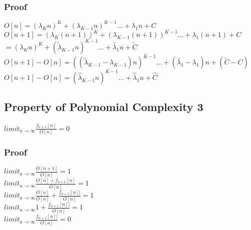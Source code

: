 \documentclass[11pt]{article}
\begin{document}
\subsubsection{Proof}
\vspace{1mm}
\begin{center}
$
O[n] = (\lambda_K n)^K + (\lambda_{K-1} n)^{K-1}... + \lambda_1 n + C
$
\\ \vspace{2mm}
$
O[n+1] = (\lambda_K (n+1))^K + (\lambda_{K-1} (n+1))^{K-1}... + \lambda_1 (n+1) + C
$
\\ \vspace{2mm}
$ 
=  (\lambda_K n)^K + (\tilde{\lambda}_{K-1} n)^{K-1}... + \tilde{\lambda_1} n + \tilde{C}
$
\\ \vspace{2mm}
$
O[n+1] - O[n] = ((\tilde{\lambda}_{K-1}- \lambda_{K-1})n)^{K-1}... + (\tilde{\lambda_1} - \lambda_1) n + (\tilde{C} - C)
$
\\ \vspace{2mm}
$
O[n+1] - O[n] = (\hat{\lambda}_{K-1}n)^{K-1}... + \hat{\lambda}_1  n + \hat{C}
$
\end{center}




\subsection{Property of Polynomial Complexity 3}
\vspace{1mm}
\begin{center}
$
limit_{n \rightarrow \infty } \frac{f_{n+1}[n]}{O[n]} = 0
$
\end{center}

\subsubsection{Proof}
\begin{center}
$
limit_{n \rightarrow \infty } \frac{O[n+1]}{O[n]} = 1
$
\\ \vspace{2mm}
$
limit_{n \rightarrow \infty } \frac{O[n] + f_{n+1}[n]}{O[n]} = 1
$
\\ \vspace{2mm}
$
limit_{n \rightarrow \infty } \frac{O[n]}{O[n]}+  \frac{f_{n+1}[n]]}{O[n]}  = 1
$
\\ \vspace{2mm}
$
limit_{n \rightarrow \infty } 1 +  \frac{f_{n+1}[n]]}{O[n]}  = 1
$
\\ \vspace{2mm}
$
limit_{n \rightarrow \infty }  \frac{f_{n+1}[n]]}{O[n]}  = 0
$
\end{center}
\end{document}
